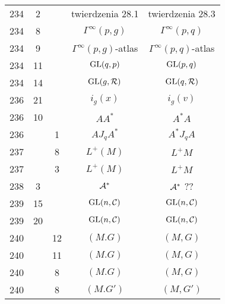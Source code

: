 \documentclass[a4paper,11pt]{article}
\begin{document}
\begin{center}
\begin{tabular}{|c|c|c|c|c|}
    234 &  2 & & twierdzenia 28.1 & twierdzenia 28.3 \\
    234 &  8 & & $\Gamma^{ \infty }( p, g )$ & $\Gamma^{ \infty }( p, q )$ \\
    234 &  9 & & $\Gamma^{ \infty }( p, g )$-atlas
           & $\Gamma^{ \infty }( p, q )$-atlas \\
    234 & 11 & & $\mathrm{GL}( q, p )$ & $\mathrm{GL}( p, q )$ \\
    234 & 14 & & $\mathrm{GL}( g, \mathcal{R} )$ & $\mathrm{GL}( q, \mathcal{R} )$ \\
    236 & 21 & & $i_{ g }( x )$ & $i_{ g }( v )$ \\
    236 & 10 & & $A A^{ * }$ & $A^{ * } A$ \\
    236 & &  1 & $A J_{ q } A^{ * }$ & $A^{ * } J_{ q } A$ \\
    237 & &  8 & $L^{ + }( M )$ & $L^{ + }M$ \\
    237 & &  3 & $L^{ + }( M )$ & $L^{ + }M$ \\
    238 &  3 & & $\mathcal{A}^{ * }$ & $\mathcal{A}^{ * }$ ?? \\
    239 & 15 & & $\mathrm{GL}( n, \mathcal{C} )$ & $\mathrm{GL}( n, \mathcal{C} )$ \\
    239 & 20 & & $\mathrm{GL}( n, \mathcal{C} )$ & $\mathrm{GL}( n, \mathcal{C} )$ \\
    240 & & 12 & $( M. G )$ & $( M, G )$ \\
    240 & & 11 & $( M. G )$ & $( M, G )$ \\
    240 & &  8 & $( M. G )$ & $( M, G )$ \\
    240 & &  8 & $( M. G' )$ & $( M, G' )$ \\
    \hline
  \end{tabular}






\end{center}
\end{document}
